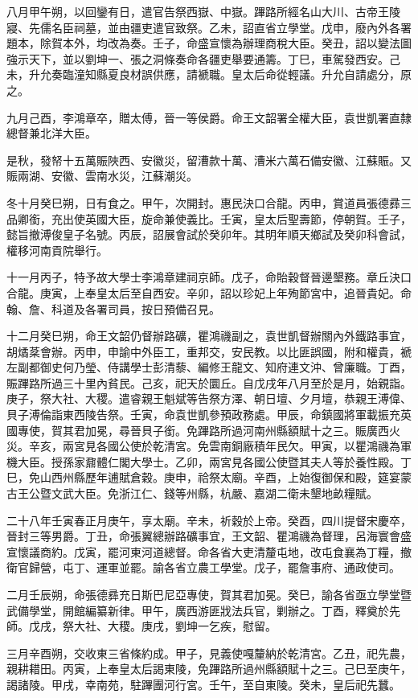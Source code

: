 \begin{pinyinscope}
八月甲午朔，以回鑾有日，遣官告祭西嶽、中嶽。蹕路所經名山大川、古帝王陵寢、先儒名臣祠墓，並由疆吏遣官致祭。乙未，詔直省立學堂。戊申，廢內外各署題本，除賀本外，均改為奏。壬子，命盛宣懷為辦理商稅大臣。癸丑，詔以變法圖強示天下，並以劉坤一、張之洞條奏命各疆吏舉要通籌。丁巳，車駕發西安。己未，升允奏臨潼知縣夏良材誤供應，請褫職。皇太后命從輕議。升允自請處分，原之。

九月己酉，李鴻章卒，贈太傅，晉一等侯爵。命王文韶署全權大臣，袁世凱署直隸總督兼北洋大臣。

是秋，發帑十五萬賑陜西、安徽災，留漕款十萬、漕米六萬石備安徽、江蘇賑。又賑兩湖、安徽、雲南水災，江蘇潮災。

冬十月癸巳朔，日有食之。甲午，次開封。惠民決口合龍。丙申，賞道員張德彞三品卿銜，充出使英國大臣，旋命兼使義比。壬寅，皇太后聖壽節，停朝賀。壬子，懿旨撤溥俊皇子名號。丙辰，詔展會試於癸卯年。其明年順天鄉試及癸卯科會試，權移河南貢院舉行。

十一月丙子，特予故大學士李鴻章建祠京師。戊子，命貽穀督晉邊墾務。章丘決口合龍。庚寅，上奉皇太后至自西安。辛卯，詔以珍妃上年殉節宮中，追晉貴妃。命翰、詹、科道及各署司員，按日預備召見。

十二月癸巳朔，命王文韶仍督辦路礦，瞿鴻禨副之，袁世凱督辦關內外鐵路事宜，胡燏棻會辦。丙申，申諭中外臣工，重邦交，安民教。以比匪誤國，附和權貴，褫左副都御史何乃瑩、侍講學士彭清藜、編修王龍文、知府連文沖、曾廉職。丁酉，賑蹕路所過三十里內貧民。己亥，祀天於圜丘。自戊戌年八月至於是月，始親詣。庚子，祭大社、大稷。遣睿親王魁斌等告祭方澤、朝日壇、夕月壇，恭親王溥偉、貝子溥倫詣東西陵告祭。壬寅，命袁世凱參預政務處。甲辰，命鎮國將軍載振充英國專使，賀其君加冕，尋晉貝子銜。免蹕路所過河南州縣額賦十之三。賑廣西火災。辛亥，兩宮見各國公使於乾清宮。免雲南銅廠積年民欠。甲寅，以瞿鴻禨為軍機大臣。授孫家鼐體仁閣大學士。乙卯，兩宮見各國公使暨其夫人等於養性殿。丁巳，免山西州縣歷年逋賦倉穀。庚申，祫祭太廟。辛酉，上始復御保和殿，筵宴蒙古王公暨文武大臣。免浙江仁、錢等州縣，杭嚴、嘉湖二衛未墾地畝糧賦。

二十八年壬寅春正月庚午，享太廟。辛未，祈穀於上帝。癸酉，四川提督宋慶卒，晉封三等男爵。丁丑，命張翼總辦路礦事宜，王文韶、瞿鴻禨為督理，呂海寰會盛宣懷議商約。戊寅，罷河東河道總督。命各省大吏清釐屯地，改屯食襄為丁糧，撤衛官歸營，屯丁、運軍並罷。諭各省立農工學堂。戊子，罷詹事府、通政使司。

二月壬辰朔，命張德彞充日斯巴尼亞專使，賀其君加冕。癸巳，諭各省亟立學堂暨武備學堂，開館編纂新律。甲午，廣西游匪戕法兵官，剿辦之。丁酉，釋奠於先師。戊戌，祭大社、大稷。庚戌，劉坤一乞疾，慰留。

三月辛酉朔，交收東三省條約成。甲子，見義使嘎釐納於乾清宮。乙丑，祀先農，親耕耤田。丙寅，上奉皇太后謁東陵，免蹕路所過州縣額賦十之三。己巳至庚午，謁諸陵。甲戌，幸南苑，駐蹕團河行宮。壬午，至自東陵。癸未，皇后祀先蠶。


\end{pinyinscope}
